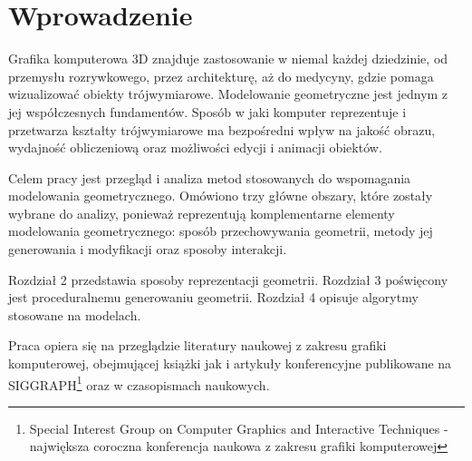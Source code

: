 \section{Wprowadzenie}
\label{sec:intro}

Grafika komputerowa 3D znajduje zastosowanie w niemal każdej dziedzinie, od przemysłu rozrywkowego, przez architekturę, aż do medycyny, gdzie pomaga wizualizować obiekty trójwymiarowe. Modelowanie geometryczne jest jednym z jej współczesnych fundamentów. Sposób w jaki komputer reprezentuje i przetwarza kształty trójwymiarowe ma bezpośredni wpływ na jakość obrazu, wydajność obliczeniową oraz możliwości edycji i animacji obiektów.

Celem pracy jest przegląd i analiza metod stosowanych do wspomagania modelowania geometrycznego. Omówiono trzy główne obszary, które zostały wybrane do analizy, ponieważ reprezentują komplementarne elementy modelowania geometrycznego: sposób przechowywania geometrii, metody jej generowania i modyfikacji oraz sposoby interakcji.

Rozdział 2 przedstawia sposoby reprezentacji geometrii. Rozdział 3 poświęcony jest proceduralnemu generowaniu geometrii. Rozdział 4 opisuje algorytmy stosowane na modelach.

Praca opiera się na przeglądzie literatury naukowej z zakresu grafiki komputerowej, obejmującej książki jak i artykuły konferencyjne publikowane na SIGGRAPH\footnote{Special Interest Group on Computer Graphics and Interactive Techniques - największa coroczna konferencja naukowa z zakresu grafiki komputerowej} oraz w czasopismach naukowych.